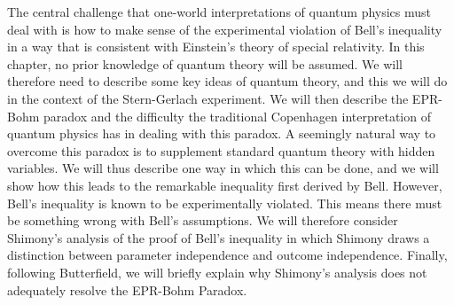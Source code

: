     The central challenge that one-world interpretations of quantum physics must deal with is how to make sense of the experimental violation of Bell's inequality in a way that is consistent with Einstein's theory of special relativity.  In this chapter, no  prior knowledge of quantum theory will be assumed. We will therefore need to describe some key ideas of quantum theory, and this we will do in the context of the  Stern-Gerlach experiment. 
    We will then describe the EPR-Bohm paradox and the difficulty the traditional Copenhagen interpretation of quantum physics has in dealing with this paradox. A seemingly natural way to overcome this paradox is to supplement standard quantum theory with hidden variables. We will thus describe one way in which this can be done, and we will show how this leads to the remarkable inequality first derived by Bell. However, Bell's inequality is known to be experimentally violated. This means there must be something wrong with Bell's assumptions. We will therefore consider Shimony's analysis of the proof of Bell's inequality in which Shimony draws a distinction between parameter independence and outcome independence. Finally, following Butterfield, we will briefly explain why Shimony's analysis does not adequately resolve the EPR-Bohm Paradox. 


    